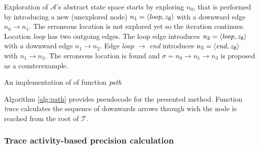 \begin{runningExample}
\begin{runningExample}
	Exploration of $\mathcal{A}$'s abstract state space starts by exploring $n_0$, that is performed by introducing a new (unexplored node) $n_1=\langle \text{\emph{loop}}, z_\emptyset \rangle$ with a downward edge $n_0 \to n_1$. The erroneous location is not explored yet so the iteration continues. Location \emph{loop} has two outgoing edges. The loop edge introduces $n_2=\langle \text{\emph{loop}}, z_\emptyset \rangle$ with a downward edge $n_1 \to n_2$. Edge \emph{loop} $\to$ \emph{end} introduces $n_3=\langle \text{\emph{end}}, z_\emptyset \rangle$ with $n_1 \to n_3$. The erroneous location is found and $\sigma= n_0 \to n_1 \to n_3$ is proposed as a counterexample.
\end{runningExample}

\begin{algorithm}
	\BlankLine
	\KwRet{\o} 
	\caption{An implementation of of function \emph{path}} \label{alg:path}
\end{algorithm}

Algorithm \ref{alg:path} provides pseudocode for the presented method. Function \emph{trace} calculates the sequence of downwards arrows through wich the node is reached from the root of $\mathcal{T}$. 

\subsubsection{Trace activity-based precision calculation}


\end{runningExample}
